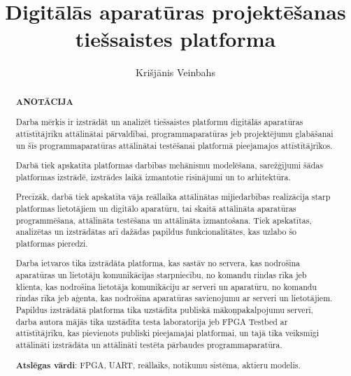 \documentclass{LU}
\title{Digitālās aparatūras projektēšanas tiešsaistes platforma}
\author{Krišjānis Veinbahs}
\begin{document}
\maketitle

\renewcommand{\abstractname}{}
\begin{abstract}
    \begin{center}
    \Large\textbf{ANOTĀCIJA}\\
    \end{center}
    \vspace{1.5\baselineskip}

    Darba mērķis ir izstrādāt un analizēt tiešsaistes platformu digitālās
    aparatūras attīstītājrīku attālinātai pārvaldībai, programmaparatūras jeb
    projektējumu glabāšanai un šīs programmaparatūras attālinātai testēšanai
    platformā pieejamajos attīstītājrīkos.

    Darbā tiek apskatīta platformas darbības mehānismu modelēšana, sarežģījumi
    šādas platformas izstrādē, izstrādes laikā izmantotie risinājumi un to
    arhitektūra.

    Precīzāk, darbā tiek apskatīta vāja reāllaika attālinātas mijiedarbības
    realizācija starp platformas lietotājiem un digitālo aparatūru, tai skaitā
    attālināta aparatūras programmēšana, attālināta testēšana un attālināta
    izmantošana. Tiek apskatītas, analizētas un izstrādātas arī dažādas papildus
    funkcionalitātes, kas uzlabo šo platformas pieredzi.

    Darba ietvaros tika izstrādāta platforma, kas sastāv no servera, kas
    nodrošina aparatūras un lietotāju komunikācijas starpniecību, no komandu
    rindas rīka jeb klienta, kas nodrošina lietotāja komunikāciju ar serveri un
    aparatūru, no komandu rindas rīka jeb aģenta, kas nodrošina aparatūras
    savienojumu ar serveri un lietotājiem. Papildus izstrādātā platforma tika
    uzstādīta publiskā mākoņpakalpojumu serverī, darba autora mājās tika
    uzstādīta testa laboratorija jeb FPGA Testbed ar attīstītājrīku, kas
    pievienots publiski pieejamajai platformai, un tajā tika veiksmīgi
    attālināti izstrādāta un attālināti testēta pārbaudes programmaparatūra.

    \textbf{Atslēgas vārdi}: FPGA, UART, reāllaiks, notikumu sistēma, aktieru modelis.
\end{abstract}
 
\end{document}

